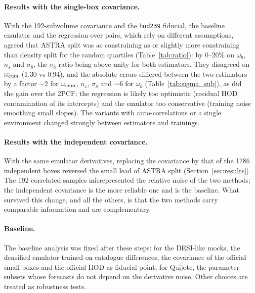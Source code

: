 \paragraph{Results with the single-box covariance.} With the 192-subvolume covariance and the \texttt{hod239} fiducial, the baseline emulator and the regression over pairs, which rely on different assumptions, agreed that ASTRA split was as constraining as or slightly more constraining than density split for the random quartiles (Table~\ref{tab:ratio}): by 0--20\% on $\omega_b$, $n_s$ and $\sigma_8$, the $\sigma_8$ ratio being above unity for both estimators. They disagreed on $\omega_{\rm cdm}$ (1.30 vs 0.94), and the absolute errors differed between the two estimators by a factor $\sim2$ for $\omega_{\rm cdm}$, $n_s$, $\sigma_8$ and $\sim6$ for $\omega_b$ (Table~\ref{tab:sigma_sub}), as did the gain over the 2PCF: the regression is likely too optimistic (residual HOD contamination of its intercepts) and the emulator too conservative (training noise smoothing small slopes). The variants with auto-correlations or a single environment changed strongly between estimators and trainings.

\paragraph{Results with the independent covariance.} With the same emulator derivatives, replacing the covariance by that of the 1786 independent boxes reversed the small lead of ASTRA split (Section~\ref{sec:results}). The 192 correlated samples misrepresented the relative noise of the two methods; the independent covariance is the more reliable one and is the baseline. What survived this change, and all the others, is that the two methods carry comparable information and are complementary.

\paragraph{Baseline.} The baseline analysis was fixed after these steps: for the DESI-like mocks, the densified emulator trained on catalogue differences, the covariance of the official small boxes and the official HOD as fiducial point; for Quijote, the parameter subsets whose forecasts do not depend on the derivative noise. Other choices are treated as robustness tests.

